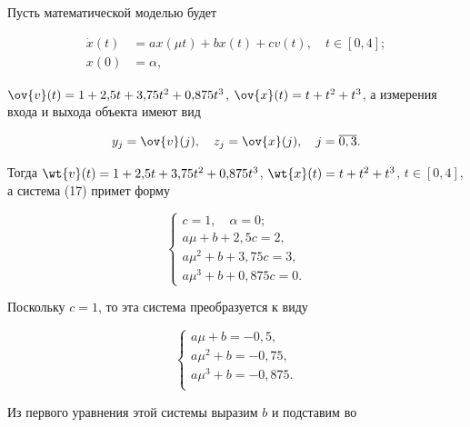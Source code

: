 \begin{exam}


Пусть математической моделью будет


\begin{align*}


\Dot{x}(t)&= ax(\mu t) + bx(t) + cv(t),\quad t\in[0,4];\\


x(0)&=\alpha,


\end{align*}


$\ov{v}(t)=1+2{,}5t+3{,}75t^2+0{,}875t^3$, $\ov{x}(t)= t + t^2 +


t^3$, а измерения входа и выхода объекта имеют вид


$$


y_j=\ov{v}(j), \quad 


z_j=\ov{x}(j), \quad j=\overline{0,3}.


$$


Тогда $\wt{v}(t)=1 + 2{,}5t + 3{,}75t^2 + 0{,}875t^3$, $\wt{x}(t)


= t + t^2 + t^3$, $t\in[0,4]$, а система (17) примет форму


$$


\begin{cases}


c=1, \quad \alpha=0; \\


a\mu + b + 2{,}5c = 2, \\


a\mu^2 + b + 3{,}75c = 3, \\


a\mu^3 + b + 0{,}875c = 0.


\end{cases}


$$


Поскольку $c=1$, то эта система преобразуется к виду


$$


\begin{cases}


a\mu + b = -0{,}5, \\


a\mu^2 + b = -0{,}75, \\


a\mu^3 + b = -0{,}875. \\


\end{cases}


$$


Из первого уравнения этой системы выразим $b$ и подставим во



\end{exam}

